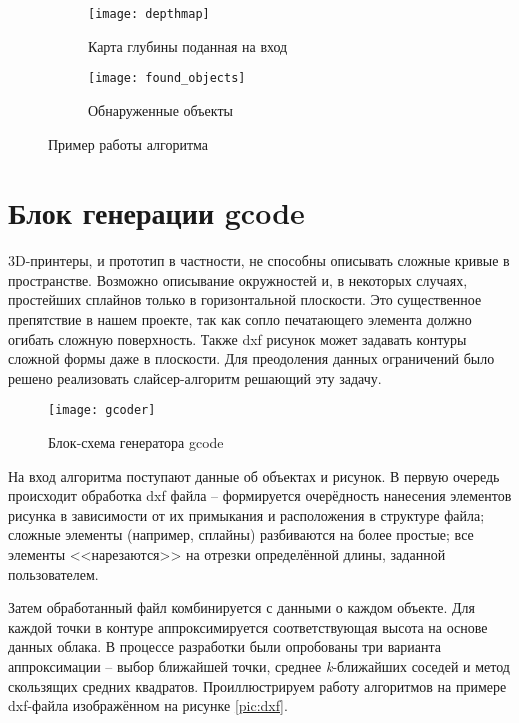         \begin{figure}[H]
            \begin{subfigure}{0.5\linewidth}
                \texttt{[image: depthmap]}
                \caption{Карта глубины поданная на вход}
            \end{subfigure}
            \begin{subfigure}{0.5\linewidth}
                \texttt{[image: found\_objects]}
                \caption{Обнаруженные объекты}
            \end{subfigure}
            \caption{Пример работы алгоритма}
            \label{pic:contour_detection}
        \end{figure}
        
    \section{Блок генерации gcode}
        3D-принтеры, и прототип в частности, не способны описывать сложные кривые в пространстве. Возможно описывание окружностей и, в некоторых случаях, простейших сплайнов только в горизонтальной плоскости. Это существенное препятствие в нашем проекте, так как сопло печатающего элемента должно огибать сложную поверхность. Также dxf рисунок может задавать контуры сложной формы даже в плоскости. Для преодоления данных ограничений было решено реализовать слайсер-алгоритм решающий эту задачу.
        
        \begin{figure}[H]
            \centering
            \texttt{[image: gcoder]}
            \caption{Блок-схема генератора gcode}
            \label{pic:gcoder}
        \end{figure}
        
         На вход алгоритма поступают данные об объектах и рисунок. В первую очередь происходит обработка dxf файла -- формируется очерёдность нанесения элементов рисунка в зависимости от их примыкания и расположения в структуре файла; сложные элементы (например, сплайны) разбиваются на более простые; все элементы <<нарезаются>> на отрезки определённой длины, заданной пользователем.
         
         Затем обработанный файл комбинируется с данными о каждом объекте. Для каждой точки в контуре аппроксимируется соответствующая высота на основе данных облака. В процессе разработки были опробованы три варианта аппроксимации -- выбор ближайшей точки, среднее \textit{k}-ближайших соседей и метод скользящих средних квадратов. Проиллюстрируем работу алгоритмов на примере dxf-файла изображённом на рисунке \ref{pic:dxf}.
                         
